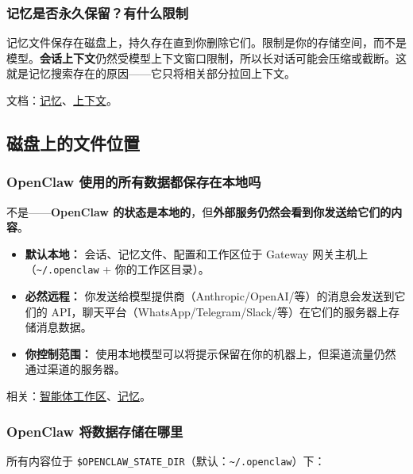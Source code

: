 \subsubsection{记忆是否永久保留？有什么限制}


记忆文件保存在磁盘上，持久存在直到你删除它们。限制是你的存储空间，而不是模型。\textbf{会话上下文}仍然受模型上下文窗口限制，所以长对话可能会压缩或截断。这就是记忆搜索存在的原因——它只将相关部分拉回上下文。

文档：\href{/concepts/memory}{记忆}、\href{/concepts/context}{上下文}。

\subsection{磁盘上的文件位置}


\subsubsection{OpenClaw 使用的所有数据都保存在本地吗}


不是——\textbf{OpenClaw 的状态是本地的}，但\textbf{外部服务仍然会看到你发送给它们的内容}。

\begin{itemize}
  \item \textbf{默认本地：} 会话、记忆文件、配置和工作区位于 Gateway 网关主机上（\texttt{\textasciitilde{}/.openclaw} + 你的工作区目录）。
  \item \textbf{必然远程：} 你发送给模型提供商（Anthropic/OpenAI/等）的消息会发送到它们的 API，聊天平台（WhatsApp/Telegram/Slack/等）在它们的服务器上存储消息数据。
  \item \textbf{你控制范围：} 使用本地模型可以将提示保留在你的机器上，但渠道流量仍然通过渠道的服务器。
\end{itemize}


相关：\href{/concepts/agent-workspace}{智能体工作区}、\href{/concepts/memory}{记忆}。

\subsubsection{OpenClaw 将数据存储在哪里}


所有内容位于 \texttt{\$OPENCLAW\_STATE\_DIR}（默认：\texttt{\textasciitilde{}/.openclaw}）下：


